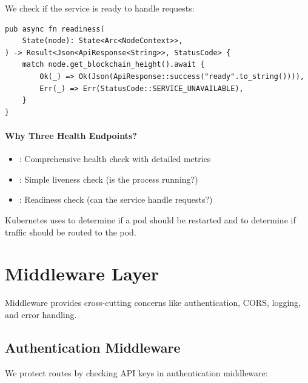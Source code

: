 We check if the service is ready to handle requests:

\begin{listing}[htbp]
\caption{Readiness probe handler}
\label{lst:handler-readiness}
\begin{verbatim}
pub async fn readiness(
    State(node): State<Arc<NodeContext>>,
) -> Result<Json<ApiResponse<String>>, StatusCode> {
    match node.get_blockchain_height().await {
        Ok(_) => Ok(Json(ApiResponse::success("ready".to_string()))),
        Err(_) => Err(StatusCode::SERVICE_UNAVAILABLE),
    }
}
\end{verbatim}
\end{listing}

\paragraph{Why Three Health Endpoints?}

\begin{itemize}
  \item {}: Comprehensive health check with detailed metrics
  \item {}: Simple liveness check (is the process running?)
  \item {}: Readiness check (can the service handle requests?)
\end{itemize}

Kubernetes uses  to determine if a pod should be restarted and  to determine if traffic should be routed to the pod.

\section{Middleware Layer}
\label{sec:middleware}

Middleware provides cross-cutting concerns like authentication, CORS, logging, and error handling.

\subsection{Authentication Middleware}

We protect routes by checking API keys in authentication middleware:


